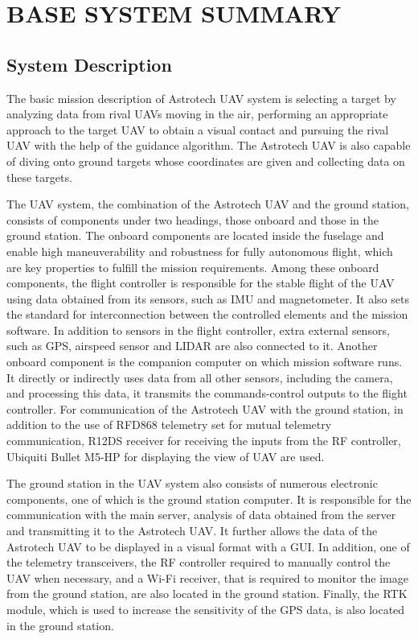 \documentclass[12pt]{article}
\begin{document}
{}
\tableofcontents %
\clearpage


\section{BASE SYSTEM SUMMARY}
\subsection{System Description}
\justify 

The basic mission description of Astrotech UAV system is selecting a target by analyzing data from rival UAVs moving in the air, performing an appropriate approach to the target UAV to obtain a visual contact and pursuing the rival UAV with the help of the guidance algorithm. The Astrotech UAV is also capable of diving onto ground targets whose coordinates are given and collecting data on these targets.

\justify
The UAV system, the combination of the Astrotech UAV and the ground station, consists of components under two headings, those onboard and those in the ground station. The onboard components are located inside the fuselage and enable high maneuverability and robustness for fully autonomous flight, which are key properties to fulfill the mission requirements. Among these onboard components, the flight controller is responsible for the stable flight of the UAV using data obtained from its sensors, such as IMU and magnetometer. It also sets the standard for interconnection between the controlled elements and the mission software. In addition to sensors in the flight controller, extra external sensors, such as GPS, airspeed sensor and LIDAR are also connected to it. Another onboard component is the companion computer on which mission software runs. It directly or indirectly uses data from all other sensors, including the camera, and processing this data, it transmits the commands-control outputs to the flight controller. For communication of the Astrotech UAV with the ground station, in addition to the use of RFD868 telemetry set for mutual telemetry communication, R12DS receiver for receiving the inputs from the RF controller, Ubiquiti Bullet M5-HP for displaying the view of UAV are used.

\justify
The ground station in the UAV system also consists of numerous electronic components, one of which is the ground station computer. It is responsible for the communication with the main server, analysis of data obtained from the server and transmitting it to the Astrotech UAV. It further allows the data of the Astrotech UAV to be displayed in a visual format with a GUI. In addition, one of the telemetry transceivers, the RF controller required to manually control the UAV when necessary, and a Wi-Fi receiver, that is required to monitor the image from the ground station, are also located in the ground station. Finally, the RTK module, which is used to increase the sensitivity of the GPS data, is also located in the ground station.
\end{document}
